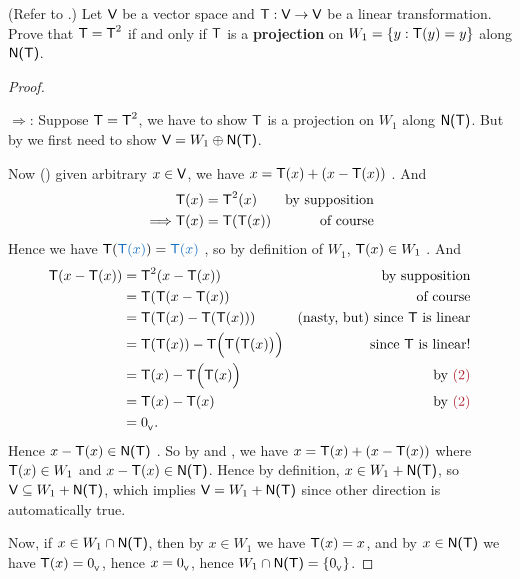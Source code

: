 \begin{exercise} \label{exercise 2.3.17}
(Refer to .)
Let \(\textsf{V}\) be a vector space and \(\textsf{T} : \textsf{V} \to \textsf{V}\) be a linear transformation.
Prove that \(\textsf{T} = \textsf{T}^2\) if and only if \(\textsf{T}\) is a \textbf{projection} on \(W_1 = \{ y : \textsf{T}(y) = y \}\)
along \(\textsf{N(T)}\).
\end{exercise}

\begin{proof} \ 

\(\Longrightarrow\): Suppose \(\textsf{T} = \textsf{T}^2\), we have to show \(\textsf{T}\) is a projection on \(W_1\) along \(\textsf{N(T)}\).
But by  we first need to show \(\textsf{V} = W_1 \oplus \textsf{N(T)}\).

Now () given arbitrary \(x \in \textsf{V}\), we have \(x = \textsf{T}(x) + (x - \textsf{T}(x))\) .
And
\begin{align*}
             & \textsf{T}(x) = \textsf{T}^2(x) & \text{by supposition} \\
    \implies & \textsf{T}(x) = \textsf{T}(\textsf{T}(x)) & \text{of course}
\end{align*}
Hence we have \(\T(\BLUE{\T(x)}) = \BLUE{\T(x)}\) , so by definition of \(W_1\), \(\textsf{T}(x) \in W_1\) .
And
\begin{align*}
        \T(x - \T(x)) & = \T^2(x - \T(x)) & \text{by supposition} \\
                      & = \T(\T(x - \T(x)) & \text{of course} \\
                      & = \T(\T(x) - \T(\T(x))) & \text{(nasty, but) since \(\T\) is linear} \\
                      & = \T(\T(x)) - \T\Big( \T \big( \T(x) \big) \Big) & \text{since \(\T\) is linear!} \\
                      & = \T(x) - \T\Big( \T(x) \Big) & \text{by \MAROON{(2)}} \\
                      & = \T(x) - \T(x) & \text{by \MAROON{(2)}} \\
                      & = \OV.
\end{align*}
Hence \(x - \textsf{T}(x) \in \textsf{N(T)}\) .
So by  and , we have \(x = \textsf{T}(x) + (x - \textsf{T}(x))\) where \(\textsf{T}(x) \in W_1\) and \(x - \textsf{T}(x) \in \textsf{N(T)}\).
Hence by definition, \(x \in W_1 + \textsf{N(T)}\), so \(\textsf{V} \subseteq W_1 + \textsf{N(T)}\), which implies \(\textsf{V} = W_1 + \textsf{N(T)}\) since other direction is automatically true.

Now, if \(x \in W_1 \cap \textsf{N(T)}\), then by \(x \in W_1\) we have \(\textsf{T}(x) = x\),
and by \(x \in \textsf{N(T)}\) we have \(\textsf{T}(x) = 0_{_{\textsf{V}}}\), hence \(x = 0_{_{\textsf{V}}}\), hence \(W_1 \cap \textsf{N(T)} = \{ 0_{_{\textsf{V}}} \}\).


\end{proof}
